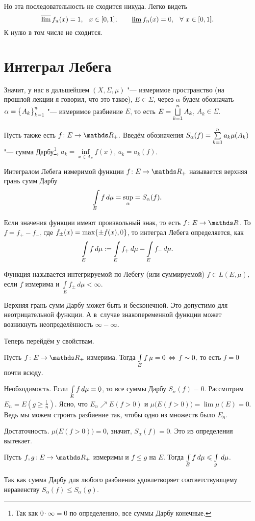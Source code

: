 Но эта последовательность не сходится никуда. Легко видеть
\[\varlimsup f_n(x)=1,\pau x\in[0,1];\qquad \varliminf f_n(x)=0,\pau \forall\ x\in[0,1].\]
К нулю в том числе не сходится.
\section{Интеграл Лебега}
Значит, у нас в дальшейшем $(X,\Sigma,\mu)$ "--- измеримое пространство (на прошлой лекции я говорил, что это такое), $E\in\Sigma$, через $\alpha$ будем обозначать $\alpha =\big\{{A}_{k}\big\}_{k=1}^{n}$ "--- измеримое разбиение $E$, то есть $E = \bigsqcup\limits_{k=1}^{n}A_k$, $A_k\in\Sigma$.

 Пусть также есть $f\colon E\to\R_+$.
 Введём обозначения $S_\alpha(f)=\sum\limits_{k = 1}^{n}a_k\mu(A_k)$ "--- сумма Дарбу\footnote{Так как $0\cdot\infty = 0$ по определению, все суммы Дарбу конечные.}, $a_k=\inf\limits_{x\in A_k}f(x)$, $a_k=a_k(f)$.

\begin{Def}
  Интегралом Лебега измеримой функции $f\colon E\to \R_+$ называется верхняя грань сумм Дарбу
  \[ \int\limits_{E}f\,d\mu = \sup\limits_\alpha = S_\alpha(f).\]

  Если значения функции имеют произвольный знак, то есть $f\colon E\to\R$. То $f = f_+-f_-$, где $f_\pm(x) \hm= \max\{\pm f(x),0\}$, то интеграл Лебега определяется, как
\[
  \int\limits_{E}f\,d\mu :=\int\limits_{E} f_+\,d\mu-\int\limits_{E}f_-\,d\mu.
\]

  Функция называется интегрируемой по Лебегу (или суммируемой) $f\in L(E,\mu)$, если $f$ измерима и $\int\limits_E f_\pm\,d\mu<\infty$.
\end{Def}

Верхняя грань сумм Дарбу может быть и бесконечной. Это допустимо для неотрицательной функции. А в~случае знакопеременной функции может возникнуть неопределённость $\infty - \infty$.

Теперь перейдём у свойствам.
\begin{Ut}
  Пусть $f\colon E\to\R_+$ измерима. Тогда $\int\limits_{E} f\,\mu=0\,\Leftrightarrow\, f\sim 0$, то есть $f=0$ почти всюду.
\end{Ut}
\begin{Proof}
Необходимость. Если $\int\limits_{E}f\,d\mu =0$, то все суммы Дарбу $S_\alpha(f)=0$. Рассмотрим $E_n = E(g\ge \frac1n)$. Ясно, что $E_n\nearrow E(f>0)$ и $\mu\big(E(f>0)\big)=\lim\mu(E) = 0$. Ведь мы можем строить разбиение так, чтобы одно из множеств было $E_n$.

Достаточность. $\mu\big(E(f>0)\big)=0$, значит, $S_\alpha(f)=0$. Это из определения вытекает.
\end{Proof}
\begin{Ut}
 Пусть $f,g\colon E\to\R_+$ измеримы и $f\le g$ на $E$. Тогда $\int\limits_{E} f\,d\mu\leqslant \int\limits_{g}\,d\mu$.
\end{Ut}
\begin{Proof}
  Так как сумма Дарбу для любого разбиения удовлетворяет соответствующему неравенству $S_\alpha(f)\le S_\alpha(g)$.
\end{Proof}

